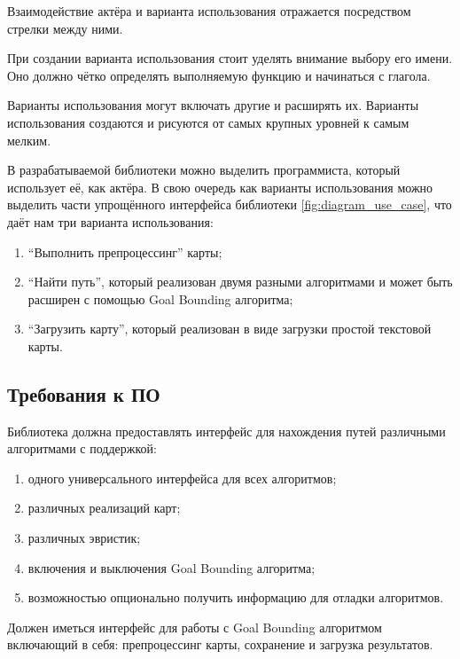 Взаимодействие актёра и варианта использования отражается посредством стрелки между ними.

При создании варианта использования стоит уделять внимание выбору его имени. Оно должно чётко определять выполняемую функцию и начинаться с глагола. 

Варианты использования могут включать другие и расширять их. Варианты использования создаются и рисуются от самых крупных уровней к самым мелким.

В разрабатываемой библиотеки можно выделить программиста, который использует её, как актёра. В свою очередь как варианты использования можно выделить части упрощённого интерфейса библиотеки \cref{fig:diagram_use_case}, что даёт нам три варианта использования: 

\begin{enumerate}
	\item ``Выполнить препроцессинг'' карты;
	\item ``Найти путь'', который реализован двумя разными алгоритмами и может быть расширен с помощью Goal Bounding алгоритма;
	\item ``Загрузить карту'', который реализован в виде загрузки простой текстовой карты.
\end{enumerate}


\subsection{Требования к ПО}

Библиотека должна предоставлять интерфейс для нахождения путей различными алгоритмами с поддержкой:

\begin{enumerate}
    \item одного универсального интерфейса для всех алгоритмов; 
	\item различных реализаций карт;
	\item различных эвристик;
	\item включения и выключения Goal Bounding алгоритма;
	\item возможностью опционально получить информацию для отладки алгоритмов.
\end{enumerate}

Должен иметься интерфейс для работы с Goal Bounding алгоритмом включающий в себя: препроцессинг карты, сохранение и загрузка результатов.

